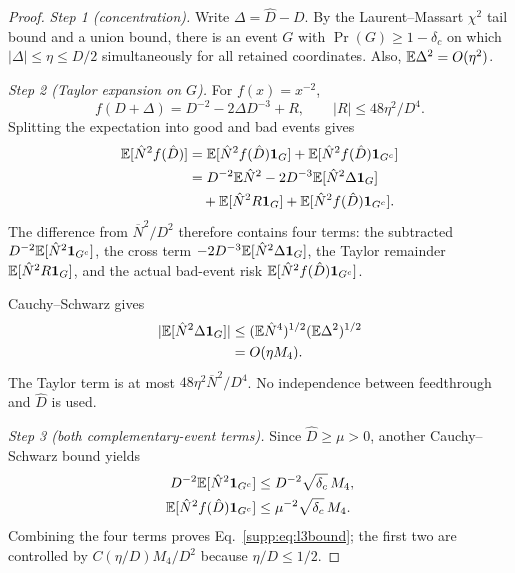 \begin{proof}
\emph{Step 1 (concentration).}
Write $\Delta=\hat D-D$. By the Laurent--Massart $\chi^2$ tail bound and a union bound, there is an event $G$ with $\Pr(G)\ge1-\delta_c$ on which $|\Delta|\le\eta\le D/2$ simultaneously for all retained coordinates. Also, $\mathbb{E}\Delta^2=O(\eta^2)$.

\emph{Step 2 (Taylor expansion on $G$).}
For $f(x)=x^{-2}$,
\begin{equation}
  f(D+\Delta)=D^{-2}-2\Delta D^{-3}+R,
  \qquad |R|\le48\eta^2/D^4 .
  \label{supp:eq:taylorlead}
\end{equation}
Splitting the expectation into good and bad events gives
\begin{align}
  \mathbb{E}[\hat N^2f(\hat D)]
  &=\mathbb{E}[\hat N^2f(\hat D)\mathbf 1_G]
  +\mathbb{E}[\hat N^2f(\hat D)\mathbf 1_{G^c}] \notag\\
  &=D^{-2}\mathbb{E}\hat N^2
  -2D^{-3}\mathbb{E}[\hat N^2\Delta\mathbf 1_G] \notag\\
  &\quad+\mathbb{E}[\hat N^2R\mathbf 1_G]
  +\mathbb{E}[\hat N^2f(\hat D)\mathbf 1_{G^c}].
  \label{supp:eq:eventdecomp}
\end{align}
The difference from $\overline N^2/D^2$ therefore contains four terms: the subtracted $D^{-2}\mathbb{E}[\hat N^2\mathbf 1_{G^c}]$, the cross term $-2D^{-3}\mathbb{E}[\hat N^2\Delta\mathbf 1_G]$, the Taylor remainder $\mathbb{E}[\hat N^2R\mathbf 1_G]$, and the actual bad-event risk $\mathbb{E}[\hat N^2f(\hat D)\mathbf 1_{G^c}]$.

Cauchy--Schwarz gives
\begin{align}
  |\mathbb{E}[\hat N^2\Delta\mathbf 1_G]|
  &\le (\mathbb{E}\hat N^4)^{1/2}(\mathbb{E}\Delta^2)^{1/2} \notag\\
  &=O(\eta M_4).
  \label{supp:eq:crosslead}
\end{align}
The Taylor term is at most $48\eta^2\overline N^2/D^4$. No independence between feedthrough and $\hat D$ is used.

\emph{Step 3 (both complementary-event terms).}
Since $\hat D\ge\mu>0$, another Cauchy--Schwarz bound yields
\begin{align}
  D^{-2}\mathbb{E}[\hat N^2\mathbf 1_{G^c}]
  &\le D^{-2}\sqrt{\delta_c}\,M_4, \notag\\
  \mathbb{E}[\hat N^2f(\hat D)\mathbf 1_{G^c}]
  &\le \mu^{-2}\sqrt{\delta_c}\,M_4.
  \label{supp:eq:badlead}
\end{align}
Combining the four terms proves Eq.~\eqref{supp:eq:l3bound}; the first two are controlled by $C(\eta/D)M_4/D^2$ because $\eta/D\le1/2$.
\end{proof}

